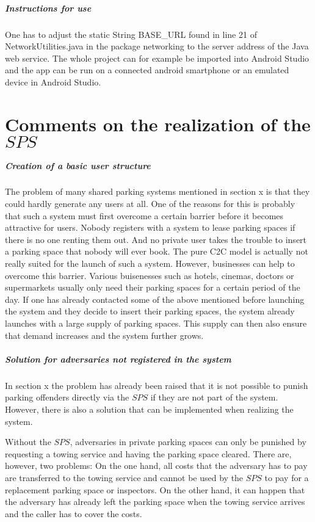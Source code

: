 \subparagraph{Instructions for use}
One has to adjust the static String BASE\_URL found in line 21 of NetworkUtilities.java in the package networking to the server address of the Java web service. The whole project can for example be imported into Android Studio and the app can be run on a connected android smartphone or an emulated device in Android Studio.

\section{Comments on the realization of the $SPS$}

\subparagraph{Creation of a basic user structure}
The problem of many shared parking systems mentioned in section x is that they could hardly generate any users at all. One of the reasons for this is probably that such a system must first overcome a certain barrier before it becomes attractive for users. Nobody registers with a system to lease parking spaces if there is no one renting them out. And no private user takes the trouble to insert a parking space that nobody will ever book. The pure C2C model is actually not really suited for the launch of such a system. However, businesses can help to overcome this barrier. Various buisenesses such as hotels, cinemas, doctors or supermarkets usually only need their parking spaces for a certain period of the day. If one has already contacted some of the above mentioned before launching the system and they decide to insert their parking spaces, the system already launches with a large supply of parking spaces. This supply can then also ensure that demand increases and the system further grows.

\subparagraph{Solution for adversaries not registered in the system}
In section x the problem has already been raised that it is not possible to punish parking offenders directly via the $SPS$ if they are not part of the system. However, there is also a solution that can be implemented when realizing the system.

Without the $SPS$, adversaries in private parking spaces can only be punished by requesting a towing service and having the parking space cleared. There are, however, two problems: On the one hand, all costs that the adversary has to pay are transferred to the towing service and cannot be used by the $SPS$ to pay for a replacement parking space or inspectors. On the other hand, it can happen that the adversary has already left the parking space when the towing service arrives and the caller has to cover the costs.

